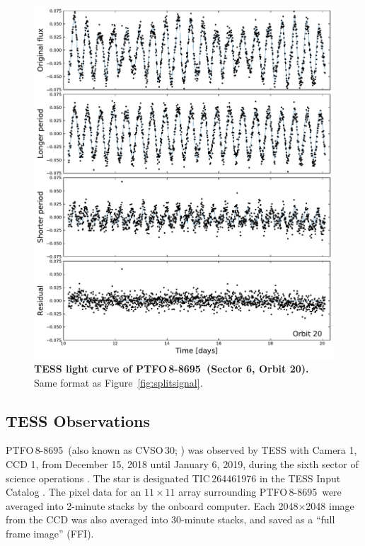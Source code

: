 \documentclass[12pt,twocolumn,tighten]{aastex62}
\newcommand{\ptfo}{PTFO$\,$8-8695}
\begin{document}
\begin{figure}[hbtp]
	\begin{center}
		\leavevmode
		\includegraphics[width=1\textwidth]{f2.pdf}
	\end{center}
	\vspace{-0.7cm}
  \caption{ {\bf TESS light curve of \ptfo\ (Sector 6, Orbit 20).}
  Same format as Figure~\ref{fig:splitsignal}.
  \label{fig:splitsignalii}
	}
\end{figure}

\subsection{TESS Observations}

\ptfo\ (also known as CVSO\,30; \citealt{briceno_cida_2005}) was
observed by TESS with Camera 1, CCD 1, from December 15, 2018 until
January 6, 2019, during the sixth sector of science operations
\citep{ricker_transiting_2015}.  The star is designated TIC\,264461976
in the TESS Input Catalog \citep{stassun_TIC_2018,stassun_TIC8_2019}.
The pixel data for an $11\times11$ array surrounding \ptfo\ were
averaged into 2-minute stacks by the onboard computer.  Each
2048$\times$2048 image from the CCD was also averaged into 30-minute
stacks, and saved as a ``full frame image'' (FFI).
\end{document}
